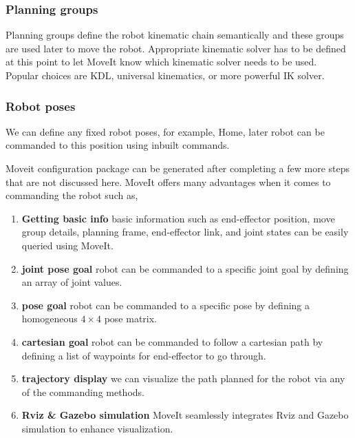 \subsubsection{Planning groups} Planning groups define the robot kinematic chain semantically and these groups are used later to move the robot. Appropriate kinematic solver has to be defined at this point to let MoveIt know which kinematic solver needs to be used. Popular choices are KDL, universal kinematics, or more powerful IK solver.

\subsubsection{Robot poses} We can define any fixed robot poses, for example, Home, later robot can be commanded to this position using inbuilt commands.

Moveit configuration package can be generated after completing a few more steps that are not discussed here. MoveIt offers many advantages when it comes to commanding the robot such as, 

\begin{enumerate}
	\item \textbf{Getting basic info} basic information such as end-effector position, move group details, planning frame, end-effector link, and joint states can be easily queried using MoveIt.
	\item \textbf{joint pose goal} robot can be commanded to a specific joint goal by defining an array of joint values.
	\item \textbf{pose goal} robot can be commanded to a specific pose by defining a homogeneous $4\times4$ pose matrix.
	\item \textbf{cartesian goal} robot can be commanded to follow a cartesian path by defining a list of waypoints for end-effector to go through.
	\item \textbf{trajectory display} we can visualize the path planned for the robot via any of the commanding methods.
	\item \textbf{Rviz \& Gazebo simulation} MoveIt seamlessly integrates Rviz and Gazebo simulation to enhance visualization.
\end{enumerate} 
